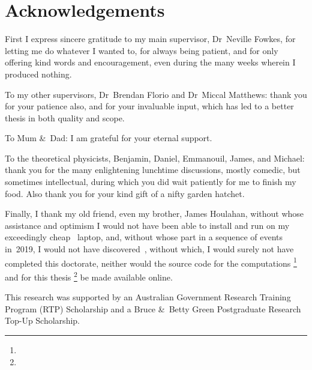 \chapter{Acknowledgements}
\label{ch:acknowledgements}

\begin{loosecontent}

First I express sincere gratitude to my main supervisor,
Dr~Neville Fowkes,
for letting me do whatever I wanted to,
for always being patient,
and for only offering kind words and encouragement,
even during the many weeks wherein I produced nothing.

To my other supervisors,
Dr~Brendan Florio and Dr~Miccal Matthews:
thank you for your patience also,
and for your invaluable input,
which has led to a better thesis in both quality and scope.

To Mum \&~Dad:
I am grateful for your eternal support.

To the theoretical physicists,
Benjamin, Daniel, Emmanouil, James, and Michael:
thank you for the many enlightening lunchtime discussions,
mostly comedic, but sometimes intellectual,
during which you did wait patiently for me to finish my food.
Also thank you for your kind gift of a nifty garden hatchet.

Finally, I thank my old friend, even my brother, James Houlahan,
without whose assistance and optimism
I would not have been able to install and run 
on my exceedingly cheap ~laptop,
and, without whose part in a sequence of events in~2019,
I would not have discovered~,
without which, I would surely not have completed this doctorate,
neither would the source code for the computations%
  \footnote{}
and for this thesis%
  \footnote{}
be made available online.

\end{loosecontent}

\thematicbreak

This research was supported
by an Australian Government Research Training Program (RTP) Scholarship
and a Bruce \&~Betty Green Postgraduate Research Top-Up Scholarship.
